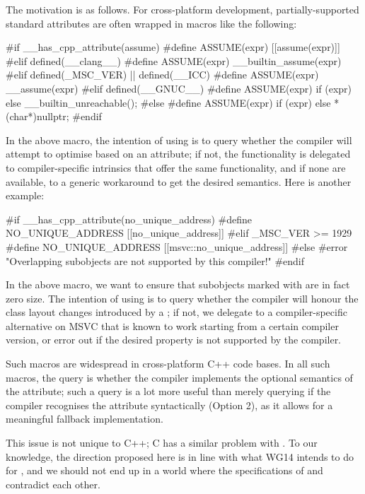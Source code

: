 The motivation is as follows. For cross-platform development, partially-supported standard attributes are often wrapped in macros like the following:

\begin{codeblock}
#if __has_cpp_attribute(assume)
  #define ASSUME(expr) [[assume(expr)]]
#elif defined(__clang__)
  #define ASSUME(expr) __builtin_assume(expr) 
#elif defined(_MSC_VER) || defined(__ICC)
  #define ASSUME(expr) __assume(expr) 
#elif defined(__GNUC__) 
  #define ASSUME(expr) if (expr) {} else { __builtin_unreachable(); }
#else
  #define ASSUME(expr) if (expr) {} else { *(char*)nullptr; }
#endif
\end{codeblock}

In the above macro, the intention of using  is to query whether the compiler will attempt to optimise based on an  attribute; if not, the functionality is delegated to compiler-specific intrinsics that offer the same functionality, and if none are available, to a generic workaround to get the desired semantics. Here is another example:

\begin{codeblock}
#if __has_cpp_attribute(no_unique_address)
  #define NO_UNIQUE_ADDRESS [[no_unique_address]]
#elif _MSC_VER >= 1929
  #define NO_UNIQUE_ADDRESS [[msvc::no_unique_address]]
#else
  #error "Overlapping subobjects are not supported by this compiler!"
#endif
\end{codeblock}

In the above macro, we want to ensure that subobjects marked with  are in fact zero size. The intention of using   is to query whether the compiler will honour the class layout changes introduced by a ; if not, we delegate to a compiler-specific alternative on MSVC that is known to work starting from a certain compiler version, or error out if the desired property is not supported by the compiler.

Such macros are widespread in cross-platform C++ code bases. In all such macros, the query is whether the compiler implements the optional semantics of the attribute; such a query is a lot more useful than merely querying if the compiler recognises the attribute syntactically (Option 2), as it allows for a meaningful fallback implementation.

This issue is not unique to C++; C has a similar problem with . To our knowledge, the direction proposed here is in line with what WG14 intends to do for , and we should not end up in a world where the specifications of  and  contradict each other.

